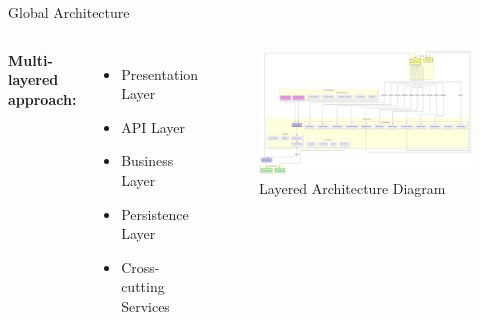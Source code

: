 \documentclass[aspectratio=169]{beamer}
\begin{document}
\begin{frame}{Global Architecture}
    \begin{columns}
        \textbf{Multi-layered approach:}
        \begin{itemize}
            \item Presentation Layer
            \item API Layer
            \item Business Layer
            \item Persistence Layer
            \item Cross-cutting Services
        \end{itemize}
        \begin{figure}
            \includegraphics[width=\textwidth,height=0.6\textheight,keepaspectratio]{../pfe-pics/diagrames/archetecture.png}
            \caption{Layered Architecture Diagram}
        \end{figure}
    \end{columns}
\end{frame}
\end{document}
